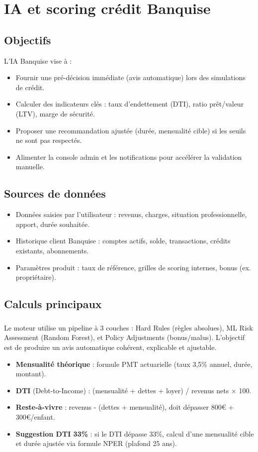 \documentclass[12pt,a4paper]{report}
\begin{document}
\chapter{IA et scoring crédit Banquise}

\section{Objectifs}
L'IA Banquise vise à :
\begin{itemize}[leftmargin=1.3cm]
    \item Fournir une pré-décision immédiate (avis automatique) lors des simulations de crédit.
    \item Calculer des indicateurs clés : taux d'endettement (DTI), ratio prêt/valeur (LTV), marge de sécurité.
    \item Proposer une recommandation ajustée (durée, mensualité cible) si les seuils ne sont pas respectés.
    \item Alimenter la console admin et les notifications pour accélérer la validation manuelle.
\end{itemize}

\section{Sources de données}
\begin{itemize}[leftmargin=1.3cm]
    \item Données saisies par l'utilisateur : revenus, charges, situation professionnelle, apport, durée souhaitée.
    \item Historique client Banquise : comptes actifs, solde, transactions, crédits existants, abonnements.
    \item Paramètres produit : taux de référence, grilles de scoring internes, bonus (ex. propriétaire).
\end{itemize}

\section{Calculs principaux}
\paragraph{}Le moteur utilise un pipeline à 3 couches : Hard Rules (règles absolues), ML Risk Assessment (Random Forest), et Policy Adjustments (bonus/malus). L'objectif est de produire un avis automatique cohérent, explicable et ajustable.
\begin{itemize}[leftmargin=1.3cm]
    \item \textbf{Mensualité théorique} : formule PMT actuarielle (taux 3{,}5\% annuel, durée, montant).
    \item \textbf{DTI} (Debt-to-Income) : (mensualité + dettes + loyer) / revenus nets × 100.
    \item \textbf{Reste-à-vivre} : revenus - (dettes + mensualité), doit dépasser 800€ + 300€/enfant.
    \item \textbf{Suggestion DTI 33\%} : si le DTI dépasse 33\%, calcul d'une mensualité cible et durée ajustée via formule NPER (plafond 25 ans).
\end{itemize}
\end{document}
